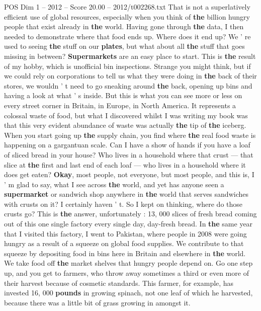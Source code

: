 \begin{textsample}{POS Dim 1 – 2012 – Score 20.00 – 2012/t002268.txt}
That is not a superlatively efficient use of global resources, especially when you think of \textbf{the} billion hungry people that exist already in \textbf{the} world.
Having gone through \textbf{the} data, I then needed to demonstrate where that food ends up.
Where does it end up?
We ' re used to seeing \textbf{the} stuff on our \textbf{plates}, but what about all \textbf{the} stuff that goes missing in between? \textbf{Supermarkets} are an easy place to start.
This is \textbf{the} result of my hobby, which is unofficial bin inspections.
Strange you might think, but if we could rely on corporations to tell us what they were doing in \textbf{the} back of their stores, we wouldn ' t need to go sneaking around \textbf{the} back, opening up bins and having a look at what ' s inside.
But this is what you can see more or less on every street corner in Britain, in Europe, in North America.
It represents a colossal waste of food, but what I discovered whilst I was writing my book was that this very evident abundance of waste was actually \textbf{the} tip of \textbf{the} iceberg.
When you start going up \textbf{the} supply chain, you find where \textbf{the} real food waste is happening on a gargantuan scale.
Can I have a show of hands if you have a loaf of sliced bread in your house?
Who lives in a household where that crust — that slice at \textbf{the} first and last end of each loaf — who lives in a household where it does get eaten? \textbf{Okay}, most people, not everyone, but most people, and this is, I ' m glad to say, what I see across \textbf{the} world, and yet has anyone seen a \textbf{supermarket} or sandwich shop anywhere in \textbf{the} world that serves sandwiches with crusts on it?
I certainly haven ' t.
So I kept on thinking, where do those crusts go?
This is \textbf{the} answer, unfortunately : 13, 000 slices of fresh bread coming out of this one single factory every single day, day-fresh bread.
In \textbf{the} same year that I visited this factory, I went to Pakistan, where people in 2008 were going hungry as a result of a squeeze on global food supplies.
We contribute to that squeeze by depositing food in bins here in Britain and elsewhere in \textbf{the} world.
We take food off \textbf{the} market shelves that hungry people depend on.
Go one step up, and you get to farmers, who throw away sometimes a third or even more of their harvest because of cosmetic standards.
This farmer, for example, has invested 16, 000 \textbf{pounds} in growing spinach, not one leaf of which he harvested, because there was a little bit of grass growing in amongst it.

\end{textsample}
